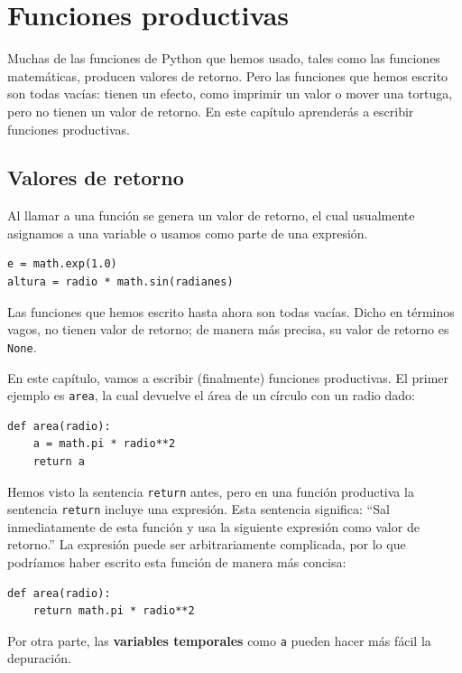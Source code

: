 \documentclass[10pt]{book}
\begin{document}
\chapter{Funciones productivas}
\label{fruitchap}

Muchas de las funciones de Python que hemos usado, tales como las funciones
matemáticas, producen valores de retorno. Pero las funciones que hemos escrito
son todas vacías: tienen un efecto, como imprimir un valor
o mover una tortuga, pero no tienen un valor de retorno.  En
este capítulo aprenderás a escribir funciones productivas.


\section{Valores de retorno}

Al llamar a una función se genera un valor de
retorno, el cual usualmente asignamos a una variable o usamos como parte de una
expresión.

\begin{verbatim}
e = math.exp(1.0)
altura = radio * math.sin(radianes)
\end{verbatim}
%
Las funciones que hemos escrito hasta ahora son todas vacías.  Dicho en términos vagos,
no tienen valor de retorno; de manera más precisa,
su valor de retorno es {\tt None}.

En este capítulo, vamos a escribir (finalmente) funciones productivas.
El primer ejemplo es {\tt area}, la cual devuelve el área de un círculo
con un radio dado:

\begin{verbatim}
def area(radio):
    a = math.pi * radio**2
    return a
\end{verbatim}
%
Hemos visto la sentencia {\tt return} antes, pero en una función
productiva la sentencia {\tt return} incluye
una expresión.  Esta sentencia significa: ``Sal inmediatamente de
esta función y usa la siguiente expresión como valor de retorno.''
La expresión puede ser arbitrariamente complicada, por lo que podríamos
haber escrito esta función de manera más concisa:

\begin{verbatim}
def area(radio):
    return math.pi * radio**2
\end{verbatim}
%
Por otra parte, las {\bf variables temporales} como {\tt a} pueden hacer
más fácil la depuración.
\end{document}
